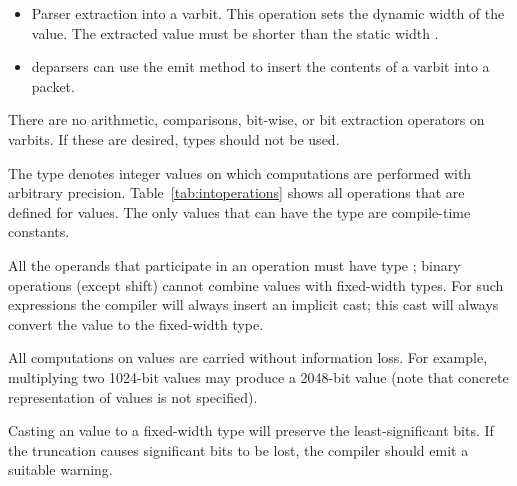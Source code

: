 \documentclass[12pt]{article}
\begin{document}
\begin{itemize}
\item Parser extraction into a varbit. This operation sets the dynamic
  width of the value.  The extracted value must be shorter than the
  static width \W.
\item deparsers can use the emit method to insert the contents of a
  varbit into a packet.
\end{itemize}

There are no arithmetic, comparisons, bit-wise, or bit extraction
operators on varbits.  If these are desired,  types
should not be used.


The type \infint{} denotes integer values on which computations are
performed with arbitrary precision.  Table~\ref{tab:intoperations}
shows all operations that are defined for \infint{} values.  The only
values that can have the type \infint{} are compile-time constants.

All the operands that participate in an operation must have type
\infint{}; binary operations (except shift) cannot combine \infint{}
values with fixed-width types.  For such expressions the compiler will
always insert an implicit cast; this cast will always convert the
\infint{} value to the fixed-width type.

All computations on \infint{} values are carried without information
loss.  For example, multiplying two 1024-bit values may produce a
2048-bit value (note that concrete representation of \infint{} values
is not specified).

Casting an \infint{} value to a fixed-width type will preserve the
least-significant bits.  If the truncation causes significant bits to
be lost, the compiler should emit a suitable warning. 
\end{document}
